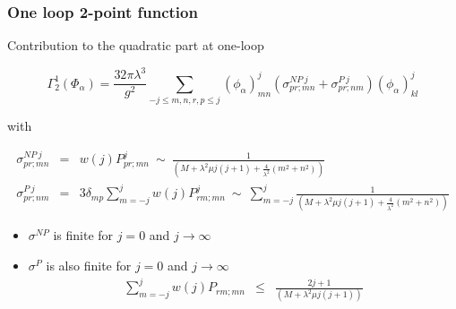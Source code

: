 \documentclass[9pt]{beamer}
\begin{document}

\begin{frame}

\frametitle{One loop 2-point function}

Contribution to the quadratic part at one-loop

\begin{equation*}
\Gamma^1_2(\Phi_\alpha)=\frac{32\pi\lambda^3}{g^2}\sum_{-j\le m,n,r,p\le j}(\phi_\alpha)^j_{mn}\left( \sigma^{NP\ j}_{pr;mn} + \sigma^{P\ j}_{pr;nm} \right)(\phi_\alpha)^j_{kl} 
\end{equation*}

with

\begin{eqnarray*}
\sigma^{NP\ j}_{pr;mn} &=& w(j)P^j_{pr;mn} \ \sim \ \frac{1}{(M+\lambda^2\mu j(j+1)+\frac{4}{\lambda^2}(m^2+n^2))} \\
%
\sigma^{P\ j}_{pr;nm} &=& 3\delta_{mp}\sum_{m=-j}^jw(j)P^j_{rm;mn} 
\ \sim \ \sum_{m=-j}^j \frac{1}{(M+\lambda^2\mu j(j+1)+\frac{4}{\lambda^2}(m^2+n^2))}
\end{eqnarray*}

\begin{itemize}
\item $\sigma^{NP}$ is finite for $j=0$ and $j\to\infty$

\item $\sigma^{P}$ is also finite for $j=0$ and $j\to\infty$
%
\begin{eqnarray*}
\sum_{m=-j}^j w(j)P_{rm;mn} &\leq& \frac{2j+1}{\left(M+\lambda^2\mu j(j+1)\right)}
\end{eqnarray*}
\end{itemize}


\end{frame}

\end{document}
